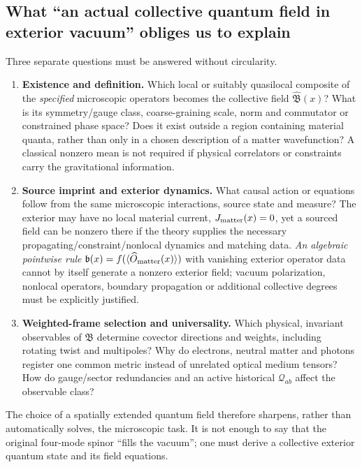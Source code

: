 \documentclass[11pt,a4paper]{article}
\begin{document}
\subsection{What ``an actual collective quantum field in exterior vacuum'' obliges us to explain}
\label{sec:v13-vacuum-obligation}
Three separate questions must be answered without circularity.
\begin{enumerate}[label=\textbf{V\arabic*.},leftmargin=18mm]
\item \textbf{Existence and definition.} Which local or suitably quasilocal composite of the \emph{specified} microscopic operators becomes the collective field $\widehat{\mathfrak B}(x)$? What is its symmetry/gauge class, coarse-graining scale, norm and commutator or constrained phase space? Does it exist outside a region containing material quanta, rather than only in a chosen description of a matter wavefunction? A classical nonzero mean is not required if physical correlators or constraints carry the gravitational information.
\item \textbf{Source imprint and exterior dynamics.} What causal action or equations follow from the same microscopic interactions, source state and measure? The exterior may have no local material current, $J_{\rm matter}(x)=0$, yet a sourced field can be nonzero there if the theory supplies the necessary propagating/constraint/nonlocal dynamics and matching data. \emph{An algebraic pointwise rule} $\mathfrak b(x)=f(\langle\widehat O_{\rm matter}(x)\rangle)$ with vanishing exterior operator data cannot by itself generate a nonzero exterior field; vacuum polarization, nonlocal operators, boundary propagation or additional collective degrees must be explicitly justified.
\item \textbf{Weighted-frame selection and universality.} Which physical, invariant observables of $\mathfrak B$ determine covector directions and weights, including rotating twist and multipoles? Why do electrons, neutral matter and photons register one common metric instead of unrelated optical medium tensors? How do gauge/sector redundancies and an active historical $\mathcal Q_{ab}$ affect the observable class?
\end{enumerate}
The choice of a spatially extended quantum field therefore sharpens, rather than automatically solves, the microscopic task. It is not enough to say that the original four-mode spinor ``fills the vacuum''; one must derive a collective exterior quantum state and its field equations.
\end{document}
